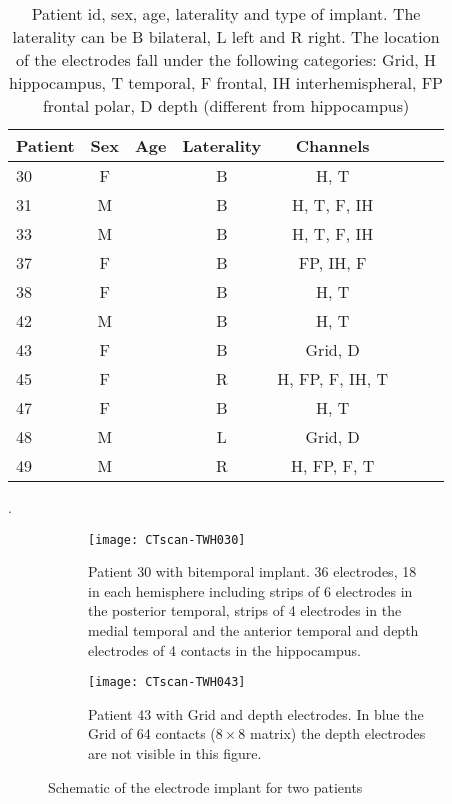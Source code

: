 \documentclass[11pt, onecolumn]{article}
\begin{document}
\begin{table}
\centering
\begin{tabular}{l*{6}{c}r}
Patient & Sex & Age & Laterality & Channels  \\
\hline
30 & F &  & B & H, T \\
31 & M &  & B & H, T, F, IH \\
33 & M &  & B & H, T, F, IH \\
37 & F &  & B & FP, IH, F  \\
38 & F &  & B & H, T \\
42 & M &  & B & H, T  \\ %
43 & F &  & B & Grid, D \\%
45 & F &  & R & H, FP, F, IH, T   \\
47 & F &  & B & H, T  \\
48 & M &  & L & Grid, D \\ %
49 & M &  & R & H, FP, F, T   \\
\end{tabular}
\caption{\label{Table:demog} Patient id, sex, age, laterality and type of implant. 
The laterality can be B bilateral, L left and R right. The location of the electrodes fall under the following categories: Grid, H hippocampus, T temporal, F frontal, IH interhemispheral, FP frontal polar, D depth (different from hippocampus)}.
\end{table}

\begin{figure}[ht] 
  \begin{subfigure}[t]{0.5\linewidth}
    \centering
    \texttt{[image: CTscan-TWH030]} 
    \caption{Patient 30 with bitemporal implant. 36 electrodes, 18 in each hemisphere including strips of 6 electrodes in the posterior temporal, strips of 4 electrodes in the medial temporal and the anterior temporal and depth electrodes of 4 contacts in the hippocampus.} 
    \label{fig0:a} 
    \vspace{4ex}
  \end{subfigure}%
  \hspace{1ex}
  \begin{subfigure}[t]{0.5\linewidth}
    \centering
    \texttt{[image: CTscan-TWH043]} 
    \caption{Patient 43 with Grid and depth electrodes. In blue the Grid of 64 contacts ($8 \times 8$ matrix) the depth electrodes are not visible in this figure.} 
    \label{fig0:b} 
    \vspace{4ex}
  \end{subfigure} 
  \caption{Schematic of the electrode implant for two patients}
  \label{fig0} 
\end{figure}
\end{document}
